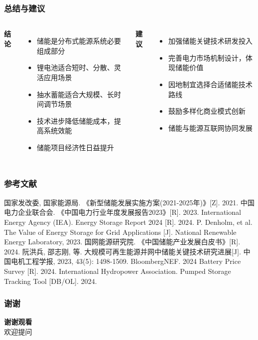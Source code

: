 \documentclass[aspectratio=169]{beamer}
\begin{document}
\begin{frame}
    \frametitle{总结与建议}
    \begin{columns}
        \textbf{结论}
        \begin{itemize}
            \item 储能是分布式能源系统必要组成部分
            \item 锂电池适合短时、分散、灵活应用场景
            \item 抽水蓄能适合大规模、长时间调节场景
            \item 技术进步降低储能成本，提高系统效能
            \item 储能项目经济性日益提升
        \end{itemize}
        
        \textbf{建议}
        \begin{itemize}
            \item 加强储能关键技术研发投入
            \item 完善电力市场机制设计，体现储能价值
            \item 因地制宜选择合适储能技术路线
            \item 鼓励多样化商业模式创新
            \item 储能与能源互联网协同发展
        \end{itemize}
    \end{columns}
\end{frame}

\begin{frame}
    \frametitle{参考文献}
    \scriptsize  %
    \setlength{\itemsep}{-0.2em} %
    \begin{thebibliography}{99}
         国家发改委, 国家能源局. 《新型储能发展实施方案(2021-2025年)》[Z]. 2021.
         中国电力企业联合会. 《中国电力行业年度发展报告2023》[R]. 2023.
         International Energy Agency (IEA). Energy Storage Report 2024 [R]. 2024.
         P. Denholm, et al. The Value of Energy Storage for Grid Applications [J]. National Renewable Energy Laboratory, 2023.
         国网能源研究院. 《中国储能产业发展白皮书》[R]. 2024.
         阮洪兵, 邵志刚, 等. 大规模可再生能源并网中储能关键技术研究进展[J]. 中国电机工程学报, 2023, 43(5): 1498-1509.
         BloombergNEF. 2024 Battery Price Survey [R]. 2024.
         International Hydropower Association. Pumped Storage Tracking Tool [DB/OL]. 2024.
    \end{thebibliography}
    \vspace{-1em}
    
    
\end{frame}

\begin{frame}
    \frametitle{谢谢}
    \centering
    \LARGE \textbf{谢谢观看}\\
    \vspace{1cm}
    \Large 欢迎提问
\end{frame}
\end{document}
